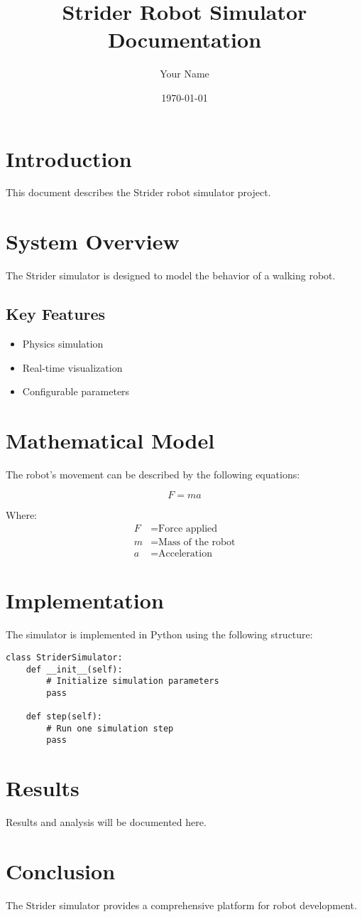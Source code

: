 \documentclass{article}
\title{Strider Robot Simulator Documentation}
\author{Your Name}
\date{\today}
\begin{document}
\maketitle

\section{Introduction}
This document describes the Strider robot simulator project.

\section{System Overview}
The Strider simulator is designed to model the behavior of a walking robot.

\subsection{Key Features}
\begin{itemize}
    \item Physics simulation
    \item Real-time visualization
    \item Configurable parameters
\end{itemize}

\section{Mathematical Model}
The robot's movement can be described by the following equations:

\begin{equation}
    F = ma
\end{equation}

Where:
\begin{align}
    F &= \text{Force applied} \\
    m &= \text{Mass of the robot} \\
    a &= \text{Acceleration}
\end{align}

\section{Implementation}
The simulator is implemented in Python using the following structure:

\begin{verbatim}
class StriderSimulator:
    def __init__(self):
        # Initialize simulation parameters
        pass
    
    def step(self):
        # Run one simulation step
        pass
\end{verbatim}

\section{Results}
Results and analysis will be documented here.

\section{Conclusion}
The Strider simulator provides a comprehensive platform for robot development.
\end{document}
